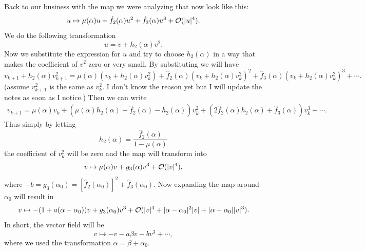 Back to our business with the map we were analyzing that now look like this:
\[ u \mapsto \mu(\alpha)u + \hat{f}_2(\alpha)u^2 + \hat{f}_3(\alpha)u^3 + \mathcal{O}(|u|^4). \]
We do the following transformation
\[ u = v + h_2(\alpha) v^2. \]
Now we substitute the expression for $u$ and try to choose $h_2(\alpha)$ in a way that makes the coefficient of $v^2$ zero or very small. By substituting we will have
\[ v_{k+1} + h_2(\alpha)v_{k+1}^2 = \mu(\alpha)(v_k+h_2(\alpha)v_k^2) + \hat{f}_2(\alpha)(v_k+h_2(\alpha)v_k^2)^2 + \hat{f}_3(\alpha)(v_k+h_2(\alpha)v_k^2)^3 + \cdots. \]
(assume $v_{k+1}^2$ is the same as $v_k^2$. I don't know the reason yet but I will update the notes as soon as I notice.) Then we can write
\begin{align*}
	 v_{k+1} = \mu(\alpha)v_k + (\mu(\alpha)h_2(\alpha) + \hat{f}_2(\alpha)-h_2(\alpha))v_k^2 + (2\hat{f}_2(\alpha)h_2(\alpha)+\hat{f}_3(\alpha))v_k^3 + \cdots. 
\end{align*}
Thus simply by letting
\[ h_2(\alpha) = \frac{\hat{f}_2(\alpha)}{1-\mu(\alpha)} \]
the coefficient of $v_k^2$ will be zero and the map will transform into
\[ v \mapsto \mu(\alpha)v + g_3(\alpha)v^3 + \mathcal{O}(|v|^4), \]
where $-b = g_3(\alpha_0) = [\hat{f}_2(\alpha_0)]^2 + \hat{f}_3(\alpha_0)$. Now expanding the map around $\alpha_0$ will result in 
\[ v \mapsto -(1+a(\alpha-\alpha_0))v + g_3(\alpha_0)v^3 + \mathcal{O}(|v|^4 + |\alpha-\alpha_0|^2|v| + |\alpha-\alpha_0||v|^3).   \]
In short, the vector field will be
\[ v \mapsto -v - a\beta v - bv^3 + \cdots, \]
where we used the transformation $\alpha = \beta + \alpha_0$.
